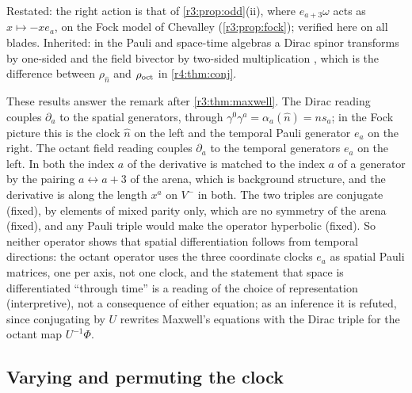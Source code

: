 Restated: the right action is that of \cref{r3:prop:odd}(ii), where $e_{a+3}\omega$ acts as $x\mapsto-xe_a$, on the Fock model of Chevalley
\cite{Chevalley54} (\cref{r3:prop:fock}); verified here on all blades. Inherited: in the Pauli and space-time algebras a Dirac spinor transforms
by one-sided and the field bivector by two-sided multiplication \cite{Hestenes66,Hestenes67}, which is the difference between $\rho_{\hat n}$ and $\rho_{\rm oct}$
in \cref{r4:thm:conj}.

These results answer the remark after \cref{r3:thm:maxwell}. The Dirac reading couples $\partial_a$ to the spatial generators, through $\gamma^0\gamma^a=\alpha_a(\hat n)=ns_a$;
in the Fock picture this is the clock $\hat n$ on the left and the temporal Pauli generator $e_a$ on the right. The octant field reading couples $\partial_a$ to
the temporal generators $e_a$ on the left. In both the index $a$ of the derivative is matched to the index $a$ of a generator by the pairing
$a\leftrightarrow a+3$ of the arena, which is background structure, and the derivative is along the length $x^a$ on $V^-$ in both. The two triples are
conjugate (fixed), by elements of mixed parity only, which are no symmetry of the arena (fixed), and any Pauli triple would make the operator
hyperbolic (fixed). So neither operator shows that spatial differentiation follows from temporal directions: the octant operator uses the three
coordinate clocks $e_a$ as spatial Pauli matrices, one per axis, not one clock, and the statement that space is differentiated ``through time'' is a
reading of the choice of representation (interpretive), not a consequence of either equation; as an inference it is refuted, since conjugating by $U$
rewrites Maxwell's equations with the Dirac triple for the octant map $U^{-1}\Phi$.

\subsection{Varying and permuting the clock}
\label{r4:sec:clock}

